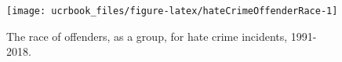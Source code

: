\documentclass[
  12pt,
  openany]{book}
\begin{document}
\begin{figure}

{\centering \texttt{[image: ucrbook\_files/figure-latex/hateCrimeOffenderRace-1]} 

}

\caption{The race of offenders, as a group, for hate crime incidents, 1991-2018.}\label{fig:hateCrimeOffenderRace}
\end{figure}

\backmatter

  
\end{document}
